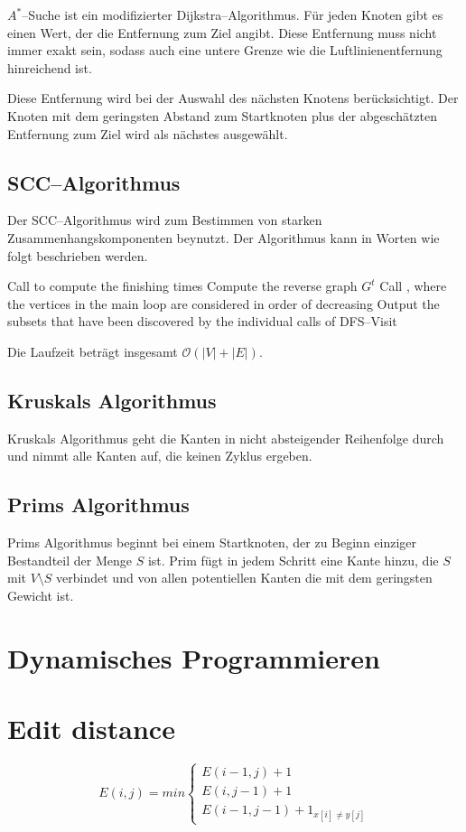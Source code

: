 \documentclass[10pt,a4paper,oneside,ngerman,numbers=noenddot]{scrartcl}
\begin{document}
		$A^{*}$--Suche ist ein modifizierter Dijkstra--Algorithmus. Für jeden Knoten gibt es einen Wert, der die Entfernung zum Ziel angibt. Diese Entfernung muss nicht immer exakt sein, sodass auch eine untere Grenze wie die Luftlinienentfernung hinreichend ist.
		
		Diese Entfernung wird bei der Auswahl des nächsten Knotens berücksichtigt. Der Knoten mit dem geringsten Abstand zum Startknoten plus der abgeschätzten Entfernung zum Ziel wird als nächstes ausgewählt.
		
	\subsection{SCC--Algorithmus}
	
		Der SCC--Algorithmus wird zum Bestimmen von starken Zusammenhangskomponenten beynutzt. Der Algorithmus kann in Worten wie folgt beschrieben werden.
		
		\begin{algorithmic}[1]
				\State Call  to compute the finishing times 
				\State Compute the reverse graph $G^{t}$
				\State Call , where the vertices in the main loop are considered in order of decreasing 
				\State Output the subsets that have been discovered by the individual calls of DFS--Visit
			\EndProcedure
		\end{algorithmic}
		
		Die Laufzeit beträgt insgesamt $\mathcal{O}(|V| + |E|)$.
		
	\subsection{Kruskals Algorithmus}
	
		Kruskals Algorithmus geht die Kanten in nicht absteigender Reihenfolge durch und nimmt alle Kanten auf, die keinen Zyklus ergeben.
		
	\subsection{Prims Algorithmus}
	
		Prims Algorithmus beginnt bei einem Startknoten, der zu Beginn einziger Bestandteil der Menge $S$ ist. Prim fügt in jedem Schritt eine Kante hinzu, die $S$ mit $V \setminus S$ verbindet und von allen potentiellen Kanten die mit dem geringsten Gewicht ist.
		
\section{Dynamisches Programmieren}

	
\section{Edit distance}

	
	\[
		E(i, j) = min\begin{cases}
			E(i - 1, j) + 1 \\
			E(i, j - 1) + 1 \\
			E(i - 1, j - 1) + \mathrm{1}_{x[i] \neq y[j]}
		\end{cases}
	\]
\end{document}
